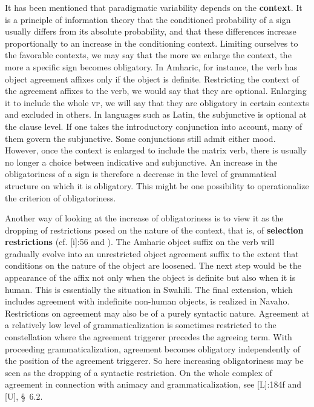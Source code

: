 It has been mentioned that paradigmatic variability depends on the \textbf{context}. It is a principle of information theory that the conditioned probability of a sign usually differs from its absolute probability, and that these differences increase proportionally to an increase in the conditioning context. Limiting ourselves to the favorable contexts, we may say that the more we enlarge the context, the more a specific sign becomes obligatory. In Amharic, for instance, the verb has object agreement affixes only if the object is definite. Restricting the context of the agreement affixes to the verb, we would say that they are optional. Enlarging it to include the whole \textsc{vp}, we will say that they are obligatory in certain contexts and excluded in others. In languages such as Latin, the subjunctive is optional at the clause level. If one takes the introductory conjunction into account, many of them govern the subjunctive. Some conjunctions still admit either mood. However, once the context is enlarged to include the matrix verb, there is usually no longer a choice between indicative and subjunctive. An increase in the obligatoriness of a sign is therefore a decrease in the level of grammatical structure on which it is obligatory. This might be one possibility to operationalize the criterion of obligatoriness.

Another way of looking at the increase of obligatoriness is to view it as the dropping of restrictions posed on the nature of the context, that is, of \textbf{selection restrictions} (cf. \citet{Vincent1980}[i]:56 and \citet[99f]{Serzisko1981} ). The Amharic object suffix on the verb will gradually evolve into an unrestricted object agreement suffix to the extent that conditions on the nature of the object are loosened. The next step would be the appearance of the affix not only when the object is definite but also when it is human. This is essentially the situation in Swahili. The final extension, which includes agreement with indefinite non-human objects, is realized in Navaho. Restrictions on agreement may also be of a purely syntactic nature. Agreement at a relatively low level of grammaticalization is sometimes restricted to the constellation where the agreement triggerer precedes the agreeing term. With proceeding grammaticalization, agreement becomes obligatory independently of the position of the agreement triggerer. So here increasing obligatoriness may be seen as the dropping of a syntactic restriction. On the whole complex of agreement in connection with animacy and grammaticalization, see \citet{Comrie1981}[L]:184f and \citet{Lehmann1982}[U], §~6.2.

